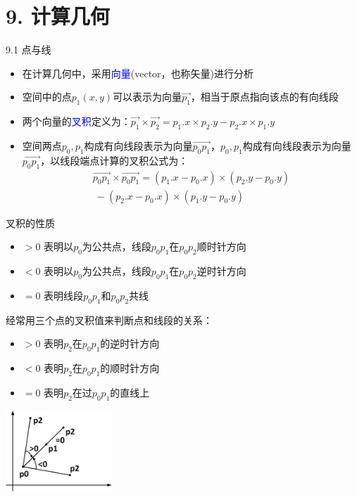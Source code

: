 


\frame{\titlepage}
\section{9. 计算几何}
\begin{frame}{9.1 点与线}
    \begin{itemize}
        \item 在计算几何中，采用\textcolor{blue}{向量}(vector，也称矢量)进行分析
        \item 空间中的点$p_1(x,y)$可以表示为向量$\vec{p_1}$，相当于原点指向该点的有向线段
        \item 两个向量的\textcolor{blue}{叉积}定义为：$\vec{p_1}\times \vec{p_2}=p_1.x\times p_2.y-p_2.x\times p_1.y$
        \item 空间两点$p_0,p_1$构成有向线段表示为向量$\vec{p_0p_1}$，$p_0,p_1$构成有向线段表示为向量$\overrightarrow{p_0p_1}$，以线段端点计算的叉积公式为：
        $$\begin{aligned}\overrightarrow{p_0p_1}\times \overrightarrow{p_0p_1}=(p_1.x-p_0.x)\times (p_2.y-p_0.y) \\\ -(p_2.x-p_0.x)\times (p_1.y-p_0.y) \end{aligned}$$
    \end{itemize}
\end{frame}
\begin{frame}{叉积的性质}
    \begin{itemize}
        \item $> 0$ 表明以$p_0$为公共点，线段$p_0p_1$在$p_0p_2$顺时针方向
        \item $< 0$ 表明以$p_0$为公共点，线段$p_0p_1$在$p_0p_2$逆时针方向
        \item $= 0$ 表明线段$p_0p_1$和$p_0p_2$共线
    \end{itemize}    
    \vfill
    经常用三个点的叉积值来判断点和线段的关系：
    \begin{itemize}
        \item $> 0$ 表明$p_2$在$p_0p_1$的逆时针方向
        \item $< 0$ 表明$p_2$在$p_0p_1$的顺时针方向
        \item $= 0$ 表明$p_2$在过$p_0p_1$的直线上
     \end{itemize}     
    \includegraphics[width=0.3\textwidth,right]{fig/9-1.png}
\end{frame}
